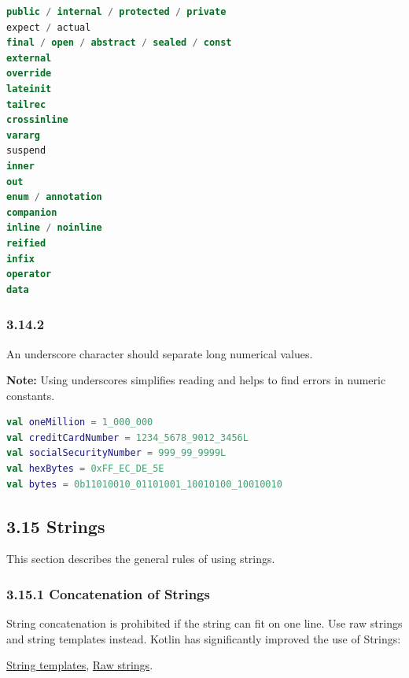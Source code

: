 {{{{\begin{lstlisting}[language=Kotlin]
public / internal / protected / private
expect / actual
final / open / abstract / sealed / const
external
override
lateinit
tailrec
crossinline
vararg
suspend
inner
out
enum / annotation
companion
inline / noinline
reified
infix
operator
data
\end{lstlisting}


\subsubsection*{\textbf{3.14.2}}
\leavevmode\newline

\label{sec:3.14.2}

An underscore character should separate long numerical values.

\textbf{Note:} Using underscores simplifies reading and helps to find errors in numeric constants.

\begin{lstlisting}[language=Kotlin]
val oneMillion = 1_000_000
val creditCardNumber = 1234_5678_9012_3456L
val socialSecurityNumber = 999_99_9999L
val hexBytes = 0xFF_EC_DE_5E
val bytes = 0b11010010_01101001_10010100_10010010
\end{lstlisting}


\subsection*{\textbf{3.15 Strings}}

\label{sec:3.15}

This section describes the general rules of using strings.



\subsubsection*{\textbf{3.15.1 Concatenation of Strings}}
\leavevmode\newline

\label{sec:3.15.1}

String concatenation is prohibited if the string can fit on one line. Use raw strings and string templates instead. Kotlin has significantly improved the use of Strings: 

\href{https://kotlinlang.org/docs/reference/basic-types.html#string-templates}{String templates}, \href{https://kotlinlang.org/docs/reference/basic-types.html#string-literals}{Raw strings}.

}}}}
